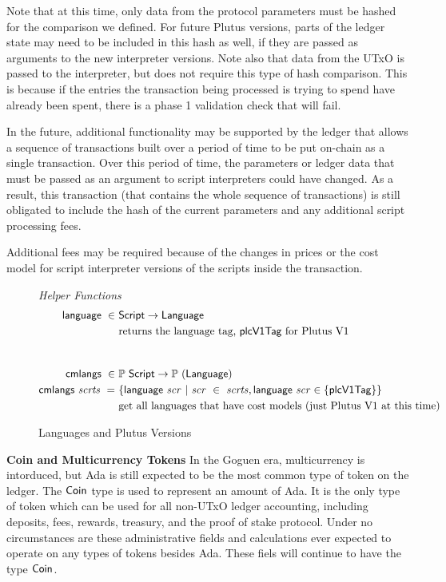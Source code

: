 Note that at this time, only data from the protocol parameters must be hashed
for the comparison we defined. For future Plutus versions, parts of the ledger
state may need to be included in this hash as well, if they are passed as
arguments to the new interpreter versions. Note also that data from the UTxO
is passed to the interpreter, but does not require this type of hash comparison.
This is because if the entries the transaction being processed is trying to
spend have already been spent, there is a phase 1 validation check that
will fail.

In the future, additional functionality may be supported by the ledger that
allows a sequence of transactions built over a period of time to be put on-chain
as a single transaction. Over this period of time, the parameters or ledger
data that must be passed as an argument to script interpreters could have changed.
As a result, this transaction (that contains the whole sequence of
transactions) is still obligated to include the hash of the current parameters
and any additional script processing fees.

Additional fees may be required because of the changes in prices or the cost model
for script interpreter versions of the scripts inside the transaction.

\begin{figure*}[htb]
  \emph{Helper Functions}
  \begin{align*}
    \fun{language} ~\in~& \Script \to \Language \\
    &\text{returns the language tag, $\mathsf{plcV1Tag}$ for Plutus V1} \\
    \nextdef
    \fun{cmlangs} ~\in~& \powerset{\Script} \to \powerset{(\Language)} \\
    \fun{cmlangs}~ \var{scrts} ~=~ & \{ \fun{language}~\var{scr} ~\vert~
      \var{scr}~\in~ \var{scrts}, \fun{language}~\var{scr} \in \{\mathsf{plcV1Tag} \}  \}\\
    &\text{get all languages that have cost models (just Plutus V1 at this time)} \\
  \end{align*}
  \caption{Languages and Plutus Versions}
  \label{fig:defs:functions-chain-helper}
\end{figure*}

\textbf{Coin and Multicurrency Tokens}
In the Goguen era, multicurrency is intorduced, but Ada is still expected to be
the most common type of token on the ledger.
The $\mathsf{Coin}$ type is used to represent an amount of Ada.
It is the only
type of token which can be used for all non-UTxO ledger accounting, including deposits,
fees, rewards, treasury, and the proof of stake protocol. Under no circumstances
are these administrative fields and calculations ever expected to operate on
any types of tokens besides Ada. These fiels will continue to have the type $\mathsf{Coin}$.

